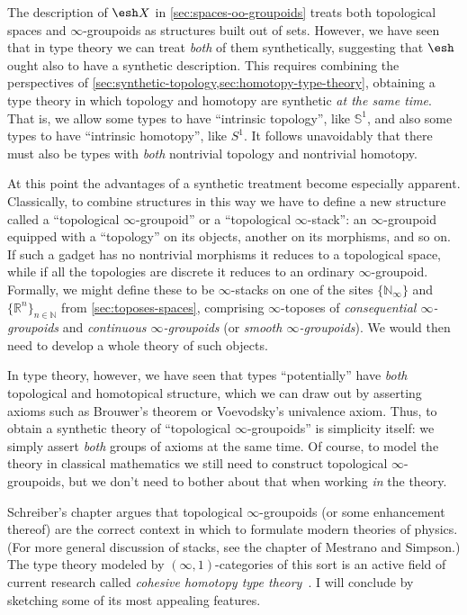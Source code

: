 \documentclass[10pt]{article}
\def\oo{\ensuremath{\infty}}
\def\io{\ensuremath{(\oo,1)}}
\def\N{\mathbb{N}}
\def\R{\mathbb{R}}
\def\hocirc{S^1}
\def\topcirc{\mathbb{S}^1}
\numberwithin{equation}{section}
\newcommand{\shape}{\ensuremath{\mathord{\raisebox{0.5pt}{\text{\rm\esh}}}}}
\begin{document}
The description of $\shape X$ in \cref{sec:spaces-oo-groupoids} treats both topological spaces and \oo-groupoids as structures built out of sets.
However, we have seen that in type theory we can treat \emph{both} of them synthetically, suggesting that $\shape$ ought also to have a synthetic description.
This requires combining the perspectives of \cref{sec:synthetic-topology,sec:homotopy-type-theory}, obtaining a type theory in which topology and homotopy are synthetic \emph{at the same time}.
That is, we allow some types to have ``intrinsic topology'', like $\topcirc$, and also some types to have ``intrinsic homotopy'', like $\hocirc$.
It follows unavoidably that there must also be types with \emph{both} nontrivial topology and nontrivial homotopy.

At this point the advantages of a synthetic treatment become especially apparent.
Classically, to combine structures in this way we have to define a new structure called a ``topological \oo-groupoid'' or a ``topological \oo-stack'': an \oo-groupoid equipped with a ``topology'' on its objects, another on its morphisms, and so on.
If such a gadget has no nontrivial morphisms it reduces to a topological space, while if all the topologies are discrete it reduces to an ordinary \oo-groupoid.
Formally, we might define these to be \oo-stacks on one of the sites $\{\N_\oo\}$ and $\{\R^n\}_{n\in \N}$ from \cref{sec:toposes-spaces}, comprising \oo-toposes of \emph{consequential \oo-groupoids} and \emph{continuous \oo-groupoids} (or \emph{smooth \oo-groupoids}).
We would then need to develop a whole theory of such objects.

In type theory, however, we have seen that types ``potentially'' have \emph{both} topological and homotopical structure, which we can draw out by asserting axioms such as Brouwer's theorem or Voevodsky's univalence axiom.
Thus, to obtain a synthetic theory of ``topological \oo-groupoids'' is simplicity itself: we simply assert \emph{both} groups of axioms at the same time.
Of course, to model the theory in classical mathematics we still need to construct topological \oo-groupoids, but we don't need to bother about that when working \emph{in} the theory.

Schreiber's chapter argues that topological \oo-groupoids (or some enhancement thereof) are the correct context in which to formulate modern theories of physics.
(For more general discussion of stacks, see the chapter of Mestrano and Simpson.)
The type theory modeled by \io-categories of this sort is an active field of current research called \emph{cohesive homotopy type theory}~\cite{lawvere:cohesion,schreiber:dcct,ss:qgftchtt,shulman:bfp-realcohesion}.
I will conclude by sketching some of its most appealing features.
\end{document}
